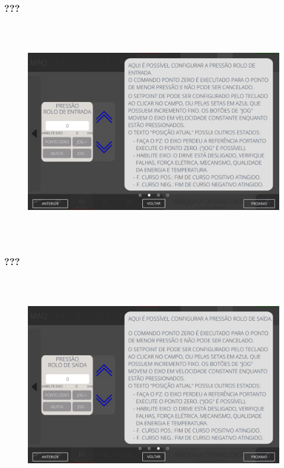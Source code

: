 \newpage
\thispagestyle{fancy}
\vspace*{\fill}
\subsubsection{\small{???}}
\begin{figure}[h]
  \centering
  \includegraphics[width=576px,height=360px]{src/imagesFlexo/07-fold/settings/e-7.png}
   \label{}
\end{figure}
\vspace*{\fill}

\newpage
\thispagestyle{fancy}
\vspace*{\fill}
\subsubsection{\small{???}}
\begin{figure}[h]
  \centering
  \includegraphics[width=576px,height=360px]{src/imagesFlexo/07-fold/settings/e-8.png}
   \label{}
\end{figure}
\vspace*{\fill}

